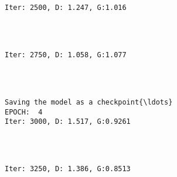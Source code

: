 \documentclass[11pt]{article}
\begin{document}
    \begin{center}
    \end{center}
    { \hspace*{\fill} \\}
    
    \begin{Verbatim}[commandchars=\\\{\}]

Iter: 2500, D: 1.247, G:1.016
    \end{Verbatim}

    \begin{center}
    \end{center}
    { \hspace*{\fill} \\}
    
    \begin{Verbatim}[commandchars=\\\{\}]

Iter: 2750, D: 1.058, G:1.077
    \end{Verbatim}

    \begin{center}
    \end{center}
    { \hspace*{\fill} \\}
    
    \begin{Verbatim}[commandchars=\\\{\}]

Saving the model as a checkpoint{\ldots}
EPOCH:  4
Iter: 3000, D: 1.517, G:0.9261
    \end{Verbatim}

    \begin{center}
    \end{center}
    { \hspace*{\fill} \\}
    
    \begin{Verbatim}[commandchars=\\\{\}]

Iter: 3250, D: 1.386, G:0.8513
    \end{Verbatim}
\end{document}
